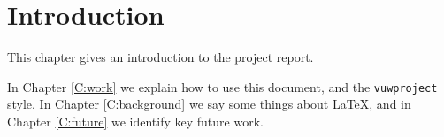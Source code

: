 \chapter{Introduction}\label{C:intro}
This chapter gives an introduction to the project report.

In Chapter \ref{C:work} we explain how to use this document, and the \texttt{vuwproject} style. In Chapter \ref{C:background} we say some things about \LaTeX, and in Chapter \ref{C:future} we identify key future work.